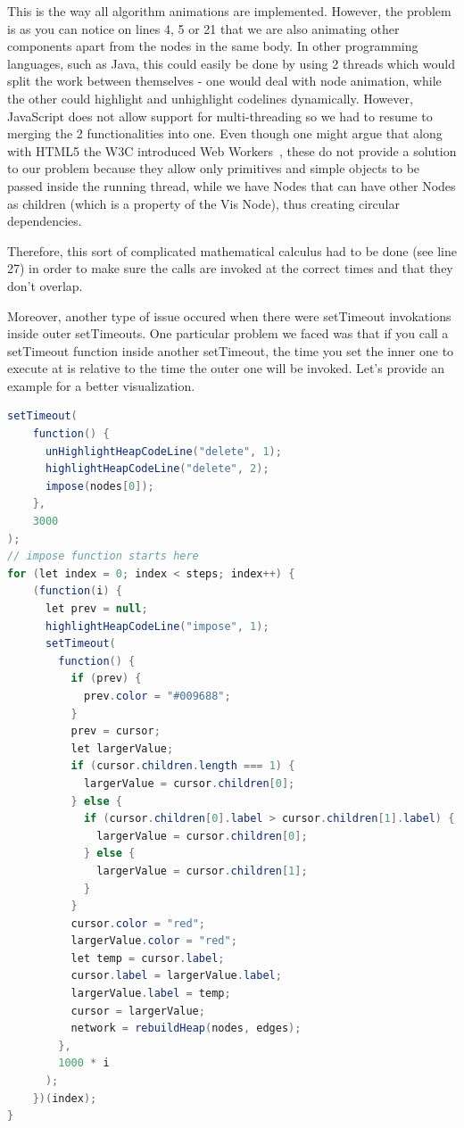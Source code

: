 \documentclass{l4proj}
\begin{document}
This is the way all algorithm animations are implemented. However, the problem is as you can notice on lines 4, 5 or 21
that we are also animating other components apart from the nodes in the same body. In other programming languages, such as Java, this
could easily be done by using 2 threads which would split the work between themselves - one would deal with node
animation, while the other could highlight and unhighlight codelines dynamically. However, JavaScript does not allow
support for multi-threading so we had to resume to merging the 2 functionalities into one. Even though one might argue
that along with HTML5 the W3C introduced Web Workers~\cite{web-worker}, these do not provide a solution to our problem
because they allow only primitives and simple objects to be passed inside the running thread, while we have Nodes that
can have other Nodes as children (which is a property of the Vis Node), thus creating circular dependencies.

Therefore, this sort of complicated mathematical calculus had to be done (see line 27) in order to make sure the calls are invoked at
the correct times and that they don't overlap. 

Moreover, another type of issue occured when there were setTimeout invokations inside outer setTimeouts. One particular
problem we faced was that if you call a setTimeout function inside another setTimeout, the time you set the inner one
to execute at is relative to the time the outer one will be invoked. Let's provide an example for a better
visualization.

\begin{lstlisting}[language=Java, caption=Heap animation that uses nested setTimeouts.]
setTimeout(
    function() {
      unHighlightHeapCodeLine("delete", 1);
      highlightHeapCodeLine("delete", 2);
      impose(nodes[0]);
    },
    3000
);
// impose function starts here
for (let index = 0; index < steps; index++) {
    (function(i) {
      let prev = null;
      highlightHeapCodeLine("impose", 1);
      setTimeout(
        function() {
          if (prev) {
            prev.color = "#009688";
          }
          prev = cursor;
          let largerValue;
          if (cursor.children.length === 1) {
            largerValue = cursor.children[0];
          } else {
            if (cursor.children[0].label > cursor.children[1].label) {
              largerValue = cursor.children[0];
            } else {
              largerValue = cursor.children[1];
            }
          }
          cursor.color = "red";
          largerValue.color = "red";
          let temp = cursor.label;
          cursor.label = largerValue.label;
          largerValue.label = temp;
          cursor = largerValue;
          network = rebuildHeap(nodes, edges);
        },
        1000 * i
      );
    })(index);
}
\end{lstlisting}
\end{document}
